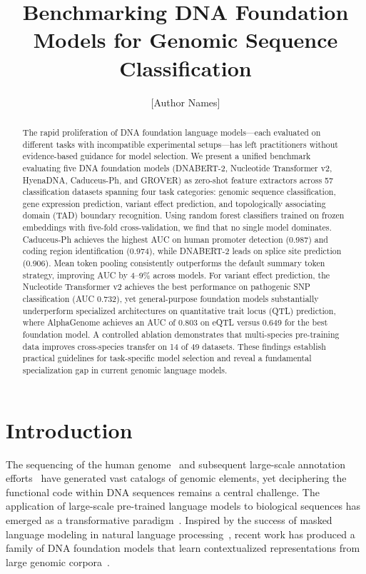 \documentclass{article}
\title{Benchmarking DNA Foundation Models for Genomic Sequence Classification}
\author{[Author Names]}
\date{}
\begin{document}
\maketitle

\begin{abstract}
The rapid proliferation of DNA foundation language models---each evaluated on
different tasks with incompatible experimental setups---has left practitioners
without evidence-based guidance for model selection. We present a unified
benchmark evaluating five DNA foundation models (DNABERT-2, Nucleotide
Transformer v2, HyenaDNA, Caduceus-Ph, and GROVER) as zero-shot feature
extractors across 57 classification datasets spanning four task categories:
genomic sequence classification, gene expression prediction, variant effect
prediction, and topologically associating domain (TAD) boundary recognition.
Using random forest classifiers trained on frozen embeddings with five-fold
cross-validation, we find that no single model dominates. Caduceus-Ph achieves
the highest AUC on human promoter detection (0.987) and coding region
identification (0.974), while DNABERT-2 leads on splice site prediction (0.906).
Mean token pooling consistently outperforms the default summary token strategy,
improving AUC by 4--9\% across models. For variant effect prediction, the
Nucleotide Transformer v2 achieves the best performance on pathogenic SNP
classification (AUC 0.732), yet general-purpose foundation models substantially
underperform specialized architectures on quantitative trait locus (QTL)
prediction, where AlphaGenome achieves an AUC of 0.803 on eQTL versus 0.649 for
the best foundation model. A controlled ablation demonstrates that multi-species
pre-training data improves cross-species transfer on 14 of 49 datasets. These
findings establish practical guidelines for task-specific model selection and
reveal a fundamental specialization gap in current genomic language models.
\end{abstract}

\section{Introduction}
\label{sec:intro}

The sequencing of the human genome~\citep{lander_2001_human} and subsequent
large-scale annotation efforts~\citep{encode_2012, roadmap_2015} have generated
vast catalogs of genomic elements, yet deciphering the functional code within
DNA sequences remains a central challenge. The application of large-scale
pre-trained language models to biological sequences has emerged as a
transformative paradigm~\citep{ji_2021_dnabert, elnaggar_2022_prottrans,
rives_2021_esm}. Inspired by the success of masked language modeling in natural
language processing~\citep{devlin_2019_bert, vaswani_2017_attention}, recent work
has produced a family of DNA foundation models that learn contextualized
representations from large genomic corpora~\citep{zhou_2024_dnabert2,
dallatorre_2024_nucleotide, nguyen_2023_hyenadna, schiff_2024_caduceus,
sanabria_2024_grover}.
\end{document}
